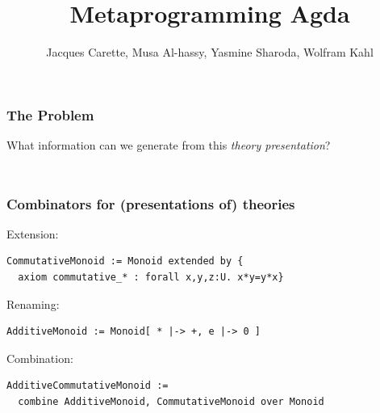 \documentclass{beamer}
\title[Metaprogramming Agda]{Metaprogramming Agda}
\author[Carette, Al-hassy, Sharoda, Kahl]
  {\Large Jacques Carette, Musa Al-hassy, Yasmine Sharoda, Wolfram Kahl}
\institute[McMaster]{McMaster University}
\begin{document}
\begin{frame}
\thispagestyle{empty}
\titlepage
\end{frame}


\begin{frame}
\frametitle{The Problem}
What information can we generate from this \emph{theory presentation}?
\begin{columns}
  \hspace*{-2.5cm}
  \begin{column}{0.5\textwidth} 
    {\tiny {} }
  \end{column}
  \hspace*{-3.2cm}
  \begin{column}{0.5\textwidth}
    {\vspace*{\fill}}
  \end{column}
\end{columns}
\end{frame}

\begin{frame}[t,fragile]
\frametitle{Combinators for (presentations of) theories}
Extension:
\begin{lstlisting}
CommutativeMonoid := Monoid extended by {
  axiom commutative_* : forall x,y,z:U. x*y=y*x}
\end{lstlisting}
Renaming:
\begin{lstlisting}
AdditiveMonoid := Monoid[ * |-> +, e |-> 0 ]
\end{lstlisting}
Combination:
\begin{lstlisting}
AdditiveCommutativeMonoid := 
  combine AdditiveMonoid, CommutativeMonoid over Monoid
\end{lstlisting}
\end{frame}
\end{document}
